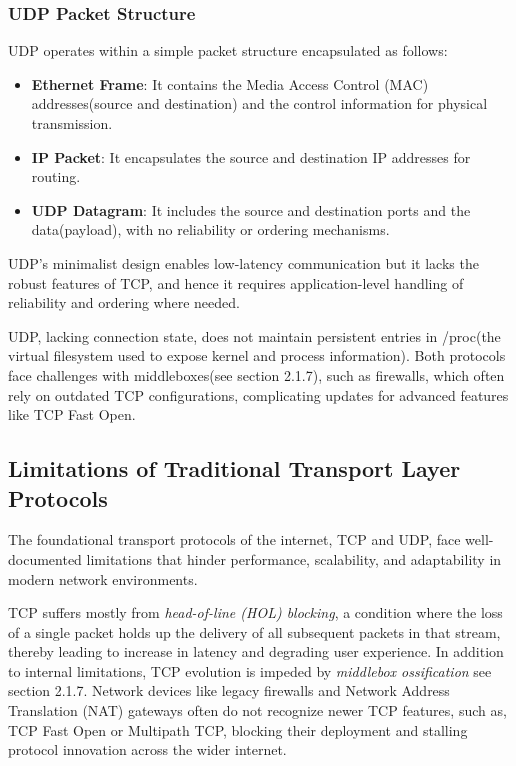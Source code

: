 \subsubsection{UDP Packet Structure}

UDP operates within a simple packet structure encapsulated as follows:

\begin{itemize}
    \item \textbf{Ethernet Frame}: It contains the Media Access Control (MAC) addresses(source and destination) and the control information for physical transmission.
    \item \textbf{IP Packet}: It encapsulates the source and destination IP addresses for routing.
    \item \textbf{UDP Datagram}: It includes the source and destination ports and the data(payload), with no reliability or ordering mechanisms.
\end{itemize}

UDP’s minimalist design enables low-latency communication but it lacks the robust features of TCP, and hence it requires application-level handling of reliability and ordering where needed.

UDP, lacking connection state, does not maintain persistent entries in /proc(the virtual filesystem used to expose kernel and process information). Both protocols face challenges with middleboxes(see section 2.1.7), such as firewalls, which often rely on outdated TCP configurations, complicating updates for advanced features like TCP Fast Open.

\subsection{Limitations of Traditional Transport Layer Protocols}

The foundational transport protocols of the internet, TCP and UDP, face well-documented limitations that hinder performance, scalability, and adaptability in modern network environments.

TCP suffers mostly from \textit{head-of-line (HOL) blocking}, a condition where the loss of a single packet holds up the delivery of all subsequent packets in that stream, thereby leading to increase in latency and degrading user experience. In addition to internal limitations, TCP evolution is impeded by \textit{middlebox ossification} see section 2.1.7. Network devices like legacy firewalls and Network Address Translation (NAT) gateways often do not recognize newer TCP features, such as, TCP Fast Open or Multipath TCP, blocking their deployment and stalling protocol innovation across the wider internet.

